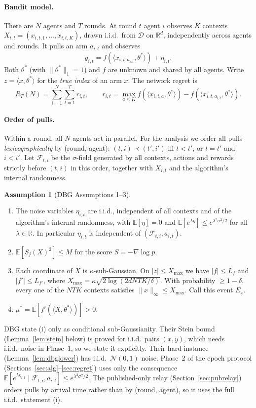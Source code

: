 \documentclass[11pt]{article}
\theoremstyle{definition}
\newtheorem{assumption}{Assumption}
\newcommand{\E}{\mathbb{E}}
\newcommand{\R}{\mathbb{R}}
\newcommand{\Xmax}{X_{\max}}
\begin{document}
\paragraph{Bandit model.} There are $N$ agents and $T$ rounds. At round $t$ agent $i$ observes $K$ contexts
$X_{i,t}=(x_{i,t,1},\dots,x_{i,t,K})$, drawn i.i.d.\ from $\mathcal D$ on $\R^d$, independently across agents
and rounds. It pulls an arm $a_{i,t}$ and observes
\[
y_{i,t}=f(\langle x_{i,t,a_{i,t}},\theta^*\rangle)+\eta_{i,t}.
\]
Both $\theta^*$ (with $\|\theta^*\|_1=1$) and $f$ are unknown and shared by all agents. Write $z=\langle x,\theta^*\rangle$
for the \emph{true index} of an arm $x$. The network regret is
\[
R_T(N)=\sum_{i=1}^N\sum_{t=1}^T r_{i,t},\qquad
r_{i,t}=\max_{a\le K} f(\langle x_{i,t,a},\theta^*\rangle)-f(\langle x_{i,t,a_{i,t}},\theta^*\rangle).
\]

\paragraph{Order of pulls.} Within a round, all $N$ agents act in parallel. For the analysis we order all pulls
\emph{lexicographically} by (round, agent): $(t,i)\prec(t',i')$ iff $t<t'$, or $t=t'$ and $i<i'$. Let
$\mathcal F_{t,i}$ be the $\sigma$-field generated by all contexts, actions and rewards strictly before $(t,i)$ in
this order, together with $X_{i,t}$ and the algorithm's internal randomness.

\begin{assumption}[DBG Assumptions 1--3]\label{ass}
\begin{enumerate}[nosep,label=(\roman*)]
\item The noise variables $\eta_{i,t}$ are i.i.d., independent of all contexts and of the algorithm's internal
randomness, with $\E[\eta]=0$ and $\E[e^{\lambda\eta}]\le e^{\lambda^2\sigma^2/2}$ for all $\lambda\in\R$. In particular
$\eta_{i,t}$ is independent of $(\mathcal F_{t,i},a_{i,t})$.
\item $\E[S_j(X)^2]\le M$ for the score $S=-\nabla\log p$.
\item Each coordinate of $X$ is $\kappa$-sub-Gaussian. On $|z|\le\Xmax$ we have $|f|\le L_f$ and $|f'|\le L_{f'}$, where
$\Xmax=\kappa\sqrt{2\log(2dNTK/\delta)}$. With probability $\ge1-\delta$, every one of the $NTK$ contexts satisfies
$\|x\|_\infty\le\Xmax$. Call this event $E_x$.
\item $\mu^*=\E[f'(\langle X,\theta^*\rangle)]>0$.
\end{enumerate}
\end{assumption}
DBG state (i) only as conditional sub-Gaussianity. Their Stein bound (Lemma~\ref{lem:stein} below) is proved for
i.i.d.\ pairs $(x,y)$, which needs i.i.d.\ noise in Phase~1, so we state it explicitly. Their hard instance
(Lemma~\ref{lem:dbglower}) has i.i.d.\ $\mathcal N(0,1)$ noise. Phase~2 of the epoch protocol
(Sections~\ref{sec:alg}--\ref{sec:regret}) uses only the consequence
$\E[e^{\lambda\eta_{i,t}}\mid\mathcal F_{t,i},a_{i,t}]\le e^{\lambda^2\sigma^2/2}$. The published-only relay
(Section~\ref{sec:pubrelay}) orders pulls by arrival time rather than by (round, agent), so it uses the full i.i.d.\
statement (i).
\end{document}
